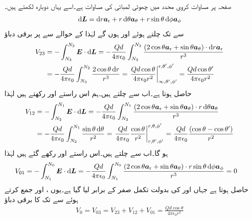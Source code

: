 صفحہ  پر مساوات  کروی محدد میں چھوٹی لمبائی  کی مساوات ہے۔اسے یہاں دوبارہ لکھتے ہیں۔
\begin{align}
\dif \kvec{L}=\dif r \ar+r \dif \theta \atheta+r\sin \theta \dif \phi \aphi
\end{align}
 سے  تک چلتے ہوئے  اور  ہوں گے لہٰذا  کے حوالے سے  پر برقی دباؤ 
\begin{align*}
V_{23}&=-\int_{N_3}^{N_2} \kvec{E} \cdot \dif \kvec{L}=-\frac{Qd }{4\pi\epsilon_0}\int_{N_3}^{N_2} \frac{( 2 \cos \theta \ar+\sin \theta \atheta)\cdot \dif r \ar}{r^3} \\
&=-\frac{Qd }{4\pi\epsilon_0}\int_{N_3}^{N_2} \frac{ 2 \cos \theta  \dif r }{r^3}=\left .\frac{Q d \cos \theta}{4 \pi \epsilon_0 r^2}\right|_{\infty,\theta',\phi'}^{r,\theta',\phi'}=\frac{Q d \cos \theta'}{4 \pi \epsilon_0 r^2}
\end{align*}
حاصل ہوتا ہے۔اب  سے  چلتے ہیں۔ہم اس راستے  اور  رکھتے ہیں لہٰذا
\begin{align*}
V_{12}&=-\int_{N_2}^{N_1} \kvec{E} \cdot \dif \kvec{L}=-\frac{Qd }{4\pi\epsilon_0}\int_{N_2}^{N_1} \frac{( 2 \cos \theta \ar+\sin \theta \atheta)\cdot  r \dif \theta \atheta}{r^3}  \\
&=-\frac{Qd }{4\pi\epsilon_0}\int_{N_2}^{N_1} \frac{\sin \theta  \dif \theta}{r^2}=\left. \frac{Qd }{4\pi\epsilon_0} \frac{\cos \theta}{r^2}\right|_{r,\theta',\phi'}^{r,\theta,\phi'}=\frac{Qd }{4\pi\epsilon_0} \frac{(\cos \theta-\cos \theta')}{r^2}
\end{align*} 
ہو گا۔اب  سے  چلتے ہیں۔اس راستے  اور  رکھے گئے ہیں لہٰذا
\begin{align*}
V_{01}&=-\int_{N_1}^{N_0} \kvec{E} \cdot \dif \kvec{L}=-\frac{Qd }{4\pi\epsilon_0}\int_{N_1}^{N_0} \frac{( 2 \cos \theta \ar+\sin \theta \atheta)\cdot  r \sin \theta \dif \phi \aphi}{r^3}=0
\end{align*} 
حاصل ہوتا ہے جہاں  اور  کی بدولت تکمل صفر کے برابر لیا گیا ہے۔یوں ،  اور  جمع کرتے ہوئے  سے  تک کا برقی دباؤ
\begin{align}
V_{0}=V_{03}=V_{23}+V_{12}+V_{01}=\frac{Qd \cos \theta}{4 \pi \epsilon_0 r^2}
\end{align}

